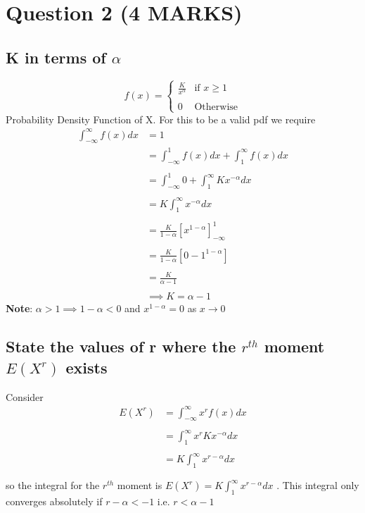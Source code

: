 \documentclass[11pt]{article}
\begin{document}
\section{Question 2 (4 MARKS)}
\subsection{K in terms of $\alpha$}
\begin{equation*}
  f(x) =
  \begin{cases}
                                   \frac{K}{x^{\alpha}} & \text{if $x \geq 1$} \\ \\
                                   0 & \text{Otherwise}
  \end{cases}
\end{equation*}
Probability Density Function of X. For this to be a valid pdf we require
\begin{align*}
    \int_{-\infty}^{\infty} f(x)dx &= 1 \\
                                   &= \int_{-\infty}^{1} f(x)dx + \int_{1}^{\infty} f(x)dx \\ \\
                                   &= \int_{-\infty}^{1} 0 + \int_{1}^{\infty} Kx^{-\alpha}dx \\ \\
                                   &= K \int_{1}^{\infty} x^{-\alpha}dx \\ \\
                                   &= \frac{K}{1-\alpha}\left[x^{1-\alpha}\right]_{-\infty}^{1} \\ \\
                                   &= \frac{K}{1-\alpha}\left[0-1^{1-\alpha}\right]\\ \\
                                   &= \frac{K}{\alpha -1 } \\ \\
                                   &\implies \boxed{K =\alpha -1}
\end{align*}
\textbf{Note}: $\alpha > 1 \implies 1-\alpha < 0$ and $x^{1-\alpha} =0 $ as $x \to 0$
\subsection{State the values of r where the $r^{th}$ moment $E(X^{r})$ exists}
Consider
\begin{align*}
    E(X^{r}) &= \int_{-\infty}^{\infty} x^{r}f(x)dx \\ \\
             &= \int_{1}^{\infty} x^{r}Kx^{-\alpha}dx \\ \\
             &= \boxed{K\int_{1}^{\infty} x^{r-\alpha}dx} \\ \\
\end{align*}
so the integral for the $r^{th}$ moment is $E(X^{r}) = K\int_{1}^{\infty} x^{r-\alpha}dx$ . This integral only converges absolutely if $r-\alpha < -1$ i.e. $\boxed{r <\alpha -1}$
\end{document}
